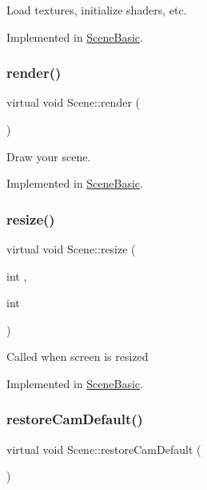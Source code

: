 Load textures, initialize shaders, etc. 

Implemented in \hyperlink{class_scene_basic_a0575ddd74a9f9a5f238def19657f275e}{Scene\+Basic}.

\hypertarget{class_scene_a823f4cd60d27932ee16f74adb0421ff6}{}\label{class_scene_a823f4cd60d27932ee16f74adb0421ff6} 
\subsubsection{\texorpdfstring{render()}{render()}}
{\footnotesize\ttfamily virtual void Scene\+::render (\begin{DoxyParamCaption}{ }\end{DoxyParamCaption})\hspace{0.3cm}{\ttfamily [pure virtual]}}

Draw your scene. 

Implemented in \hyperlink{class_scene_basic_a8cfaad3ce6a4586e088b8d55d0e23ea6}{Scene\+Basic}.

\hypertarget{class_scene_a454bd0a09c125201fbb32e15d4f62fa3}{}\label{class_scene_a454bd0a09c125201fbb32e15d4f62fa3} 
\subsubsection{\texorpdfstring{resize()}{resize()}}
{\footnotesize\ttfamily virtual void Scene\+::resize (\begin{DoxyParamCaption}\item[{int}]{,  }\item[{int}]{ }\end{DoxyParamCaption})\hspace{0.3cm}{\ttfamily [pure virtual]}}

Called when screen is resized 

Implemented in \hyperlink{class_scene_basic_af8a829370fa5e7386f46b5b659f3a083}{Scene\+Basic}.

\hypertarget{class_scene_a74dc104a3f44abf1f09d7b627c9baa36}{}\label{class_scene_a74dc104a3f44abf1f09d7b627c9baa36} 
\subsubsection{\texorpdfstring{restore\+Cam\+Default()}{restoreCamDefault()}}
{\footnotesize\ttfamily virtual void Scene\+::restore\+Cam\+Default (\begin{DoxyParamCaption}{ }\end{DoxyParamCaption})\hspace{0.3cm}{\ttfamily [pure virtual]}}



